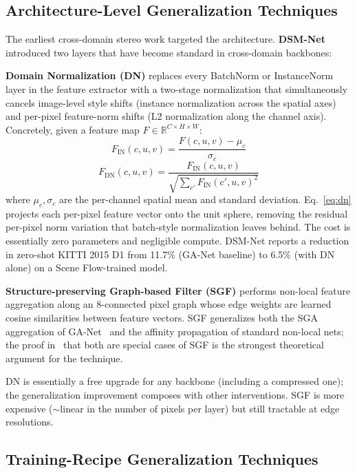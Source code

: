 \subsection{Architecture-Level Generalization Techniques}

The earliest cross-domain stereo work targeted the architecture. \textbf{DSM-Net}~\cite{zhang2020dsmnet} introduced two layers that have become standard in cross-domain backbones:

\textbf{Domain Normalization (DN)} replaces every BatchNorm or InstanceNorm layer in the feature extractor with a two-stage normalization that simultaneously cancels image-level style shifts (instance normalization across the spatial axes) and per-pixel feature-norm shifts (L2 normalization along the channel axis). Concretely, given a feature map $F \in \mathbb{R}^{C \times H \times W}$:
\begin{equation}
F_{\mathrm{IN}}(c, u, v) = \frac{F(c, u, v) - \mu_c}{\sigma_c}
\label{eq:in}
\end{equation}
\begin{equation}
F_{\mathrm{DN}}(c, u, v) = \frac{F_{\mathrm{IN}}(c, u, v)}{\sqrt{\sum_{c'} F_{\mathrm{IN}}(c', u, v)^2}}
\label{eq:dn}
\end{equation}
where $\mu_c, \sigma_c$ are the per-channel spatial mean and standard deviation. Eq.~\eqref{eq:dn} projects each per-pixel feature vector onto the unit sphere, removing the residual per-pixel norm variation that batch-style normalization leaves behind. The cost is essentially zero parameters and negligible compute. DSM-Net reports a reduction in zero-shot KITTI 2015 D1 from 11.7\% (GA-Net baseline) to 6.5\% (with DN alone) on a Scene Flow-trained model.

\textbf{Structure-preserving Graph-based Filter (SGF)} performs non-local feature aggregation along an 8-connected pixel graph whose edge weights are learned cosine similarities between feature vectors. SGF generalizes both the SGA aggregation of GA-Net~\cite{zhang2019ganet} and the affinity propagation of standard non-local nets; the proof in~\cite{zhang2020dsmnet} that both are special cases of SGF is the strongest theoretical argument for the technique.

DN is essentially a free upgrade for any backbone (including a compressed one); the generalization improvement composes with other interventions. SGF is more expensive ($\sim$linear in the number of pixels per layer) but still tractable at edge resolutions.

\subsection{Training-Recipe Generalization Techniques}

